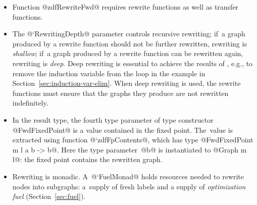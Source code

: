 \documentclass[blockstyle,preprint,natbib,nocopyrightspace]{sigplanconf}
\def\authornote#1{\unskip\relax}
\newcommand{\simon}[1]{\authornote{SLPJ: #1}}
\newcommand{\john}[1]{\authornote{JD: #1}}
\newcommand\secref[1]{Section~\ref{sec:#1}}
\begin{document}
\begin{itemize}
\item
Function @zdfRewriteFwd@ requires rewrite functions as well as transfer
functions.
\item
The @`RewritingDepth@ parameter controls recursive rewriting;
if~a graph produced by a rewrite function should not be further rewritten,
rewriting is \emph{shallow};
if~a graph produced by a rewrite function can be rewritten again,
rewriting is \emph{deep}.
Deep rewriting is essential to achieve the results of
\citet{lerner-grove-chambers:2002}, e.g., to remove the induction
variable from the loop in the example in \secref{induction-var-elim}.\john{Deep rewriting isn't needed for this example; interleaving is...}
\ifcutting\else
When deep rewriting is used, the rewrite functions must
ensure that the graphs they produce are not rewritten indefinitely.
\fi
\item
In the result type, the fourth type parameter of type constructor
@FwdFixedPoint@ is a value contained in the fixed point.
The~value is extracted using function @`zdfFpContents@, which has
type @FwdFixedPoint m l a b -> b@.
Here the type parameter~@b@ is instantiated to @Graph m l@: the fixed point
contains the rewritten graph.
\item
Rewriting is monadic.
A~@`FuelMonad@ holds resources needed to
rewrite nodes into subgraphs:
a~supply of fresh labels and a supply of \emph{optimization fuel}
(\secref{fuel}). 
\end{itemize}
\end{document}
